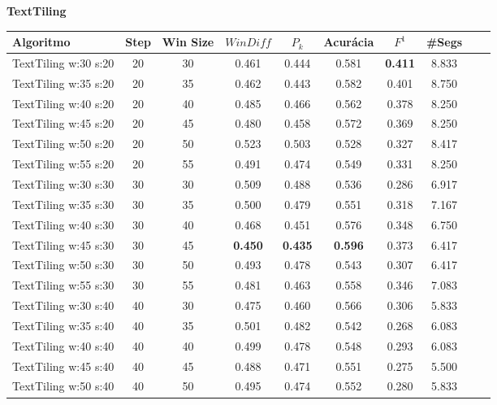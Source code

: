 \documentclass{article}
\begin{document}
 




{  
\large
\center
	\textbf{TextTiling}  

}


\begin{longtable}[c]{|l|c|c|c|c|c|c|c|c|c|} 
\hline 
Algoritmo & Step & Win Size & $WinDiff$ & $P_k$ & Acurácia & $F^1$ & \#Segs\\ \hline 
TextTiling w:30 s:20 & 20 & 30 & 0.461 & 0.444 & 0.581 & \cellcolor{gray!20} \textbf{0.411} & 8.833  \\ \hline 
 TextTiling w:35 s:20 & 20 & 35 & 0.462 & 0.443 & 0.582 & 0.401 & 8.750  \\ \hline 
 TextTiling w:40 s:20 & 20 & 40 & 0.485 & 0.466 & 0.562 & 0.378 & 8.250  \\ \hline 
 TextTiling w:45 s:20 & 20 & 45 & 0.480 & 0.458 & 0.572 & 0.369 & 8.250  \\ \hline 
 TextTiling w:50 s:20 & 20 & 50 & 0.523 & 0.503 & 0.528 & 0.327 & 8.417  \\ \hline 
 TextTiling w:55 s:20 & 20 & 55 & 0.491 & 0.474 & 0.549 & 0.331 & 8.250  \\ \hline 
 TextTiling w:30 s:30 & 30 & 30 & 0.509 & 0.488 & 0.536 & 0.286 & 6.917  \\ \hline 
 TextTiling w:35 s:30 & 30 & 35 & 0.500 & 0.479 & 0.551 & 0.318 & 7.167  \\ \hline 
 TextTiling w:40 s:30 & 30 & 40 & 0.468 & 0.451 & 0.576 & 0.348 & 6.750  \\ \hline 
 TextTiling w:45 s:30 & 30 & 45 & \cellcolor{gray!20} \textbf{0.450} & \cellcolor{gray!20} \textbf{0.435} & \cellcolor{gray!20} \textbf{0.596} & 0.373 & 6.417  \\ \hline 
 TextTiling w:50 s:30 & 30 & 50 & 0.493 & 0.478 & 0.543 & 0.307 & 6.417  \\ \hline 
 TextTiling w:55 s:30 & 30 & 55 & 0.481 & 0.463 & 0.558 & 0.346 & 7.083  \\ \hline 
 TextTiling w:30 s:40 & 40 & 30 & 0.475 & 0.460 & 0.566 & 0.306 & 5.833  \\ \hline 
 TextTiling w:35 s:40 & 40 & 35 & 0.501 & 0.482 & 0.542 & 0.268 & 6.083  \\ \hline 
 TextTiling w:40 s:40 & 40 & 40 & 0.499 & 0.478 & 0.548 & 0.293 & 6.083  \\ \hline 
 TextTiling w:45 s:40 & 40 & 45 & 0.488 & 0.471 & 0.551 & 0.275 & 5.500  \\ \hline 
 TextTiling w:50 s:40 & 40 & 50 & 0.495 & 0.474 & 0.552 & 0.280 & 5.833  \\ \hline 

\end{longtable}
\end{document}
